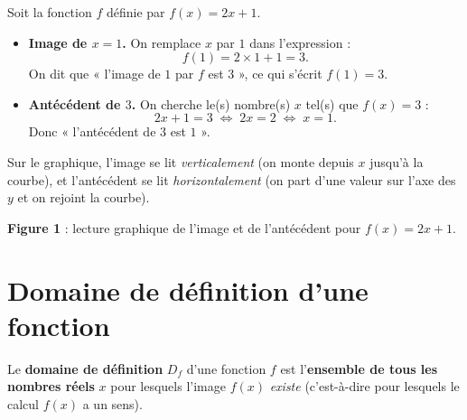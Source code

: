 \documentclass[11pt,a4paper]{article}
\newcommand{\Df}{D_f}
\begin{document}
\begin{exemple}
Soit la fonction $f$ définie par $f(x)=2x+1$.
\begin{itemize}[leftmargin=1.5em,topsep=2pt]
  \item \textbf{Image de $x=1$.} On remplace $x$ par $1$ dans l'expression :
        \[ f(1)=2\times 1 + 1 = 3. \]
        On dit que « l'image de $1$ par $f$ est $3$ », ce qui s'écrit $f(1)=3$.
  \item \textbf{Antécédent de $3$.} On cherche le(s) nombre(s) $x$ tel(s) que $f(x)=3$ :
        \[ 2x+1=3 \;\Longleftrightarrow\; 2x = 2 \;\Longleftrightarrow\; x = 1. \]
        Donc « l'antécédent de $3$ est $1$ ».
\end{itemize}
Sur le graphique, l'image se lit \emph{verticalement} (on monte depuis $x$ jusqu'à la
courbe), et l'antécédent se lit \emph{horizontalement} (on part d'une valeur sur l'axe
des $y$ et on rejoint la courbe).
\end{exemple}

\begin{center}
\textbf{\textcolor{primary}{Figure 1}} : lecture graphique de l'image et de l'antécédent pour $f(x)=2x+1$.
\end{center}

\section{Domaine de définition d'une fonction}

\begin{definition}[Domaine de définition $\Df$]
Le \textbf{domaine de définition} $\Df$ d'une fonction $f$ est l'\textbf{ensemble de
tous les nombres réels} $x$ pour lesquels l'image $f(x)$ \emph{existe} (c'est-à-dire
pour lesquels le calcul $f(x)$ a un sens).
\end{definition}
\end{document}
